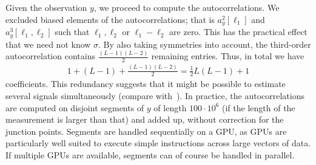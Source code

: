 \documentclass[9pt,twocolumn,twoside,lineno]{pnas-new}
\begin{document}

%
Given the observation $y$, we proceed to compute the autocorrelations. %
We excluded biased elements of the autocorrelations; that is $a_y^2[\ell_1]$ and $a_y^3[\ell_1, \ell_2]$ such that $\ell_1, \ell_2$ or $\ell_1 - \ell_2$ are zero. 
This has the  practical effect that we need not know $\sigma$. 
By also taking symmetries into account, the third-order autocorrelation contains $\frac{(L-1)(L-2)}{2}$ remaining entries. Thus, in total we have
\begin{align*}
1 + (L-1) + \frac{(L-1)(L-2)}{2} = \frac{1}{2} L (L-1) + 1
\end{align*}
coefficients. 
This redundancy suggests that it might be possible to estimate several signals simultaneously (compare with~\cite{boumal2017heterogeneous,bandeira2017estimation}).
In practice, the autocorrelations are computed on disjoint segments of $y$ of length $100\cdot10^6$ (if the length of the measurement is larger than that) and added up, without correction for the junction points. Segments are handled sequentially on a GPU, as GPUs are particularly well suited to execute simple instructions across large vectors of data. If multiple GPUs are available, segments can of course be handled in parallel.
\end{document}
